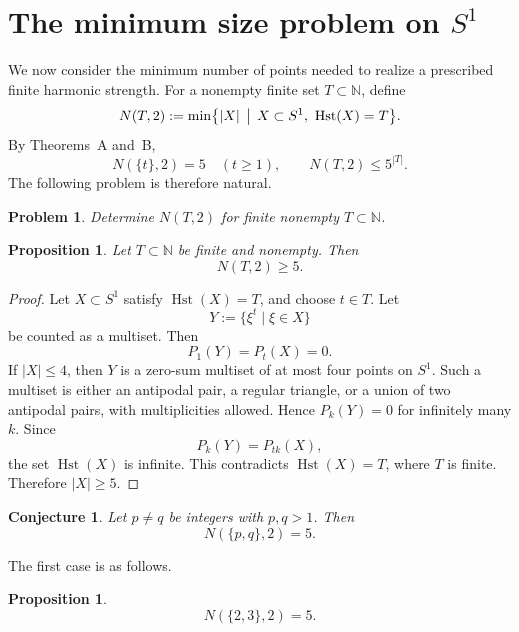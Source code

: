 \documentclass{amsart}
\newtheorem{prop}[thm]{Proposition}
\newtheorem{conj}[thm]{Conjecture}
\newtheorem{prob}[thm]{Problem}
\theoremstyle{definition}
\DeclareMathOperator{\Hst}{Hst}
\newcommand{\NN}{\mathbb{N}}
\begin{document}
\section{The minimum size problem on \(S^1\)}

We now consider the minimum number of points needed to realize a prescribed
finite harmonic strength.  For a nonempty finite set \(T\subset\NN\), define
\[
N(T,2):=\min\bigl\{|X| \,\bigm|\, X\subset S^1,\ \Hst(X)=T\bigr\}.
\]
By Theorems~A and~B,
\[
N(\{t\},2)=5\quad(t\ge1),
\qquad
N(T,2)\le 5^{|T|}.
\]
The following problem is therefore natural.

\begin{prob}
Determine \(N(T,2)\) for finite nonempty \(T\subset\NN\).
\end{prob}

\begin{prop}\label{prop:NT_ge_5}
Let \(T\subset\NN\) be finite and nonempty. Then
\[
N(T,2)\ge5.
\]
\end{prop}

\begin{proof}
Let \(X\subset S^1\) satisfy \(\Hst(X)=T\), and choose \(t\in T\).
Let
\[
Y:=\{\xi^t\mid \xi\in X\}
\]
be counted as a multiset. Then
\[
P_1(Y)=P_t(X)=0.
\]
If \(|X|\le4\), then \(Y\) is a zero-sum multiset of at most four points
on \(S^1\). Such a multiset is either an antipodal pair, a regular triangle,
or a union of two antipodal pairs, with multiplicities allowed. Hence
\(P_k(Y)=0\) for infinitely many \(k\). Since
\[
P_k(Y)=P_{tk}(X),
\]
the set \(\Hst(X)\) is infinite. This contradicts \(\Hst(X)=T\), where
\(T\) is finite. Therefore \(|X|\ge5\).
\end{proof}

\begin{conj}\label{conj:double}
Let \(p\neq q\) be integers with \(p,q>1\). Then
\[
N(\{p,q\},2)=5.
\]
\end{conj}

The first case is as follows.

\begin{prop}\label{prop:23}
\[
N(\{2,3\},2)=5.
\]
\end{prop}
\end{document}
